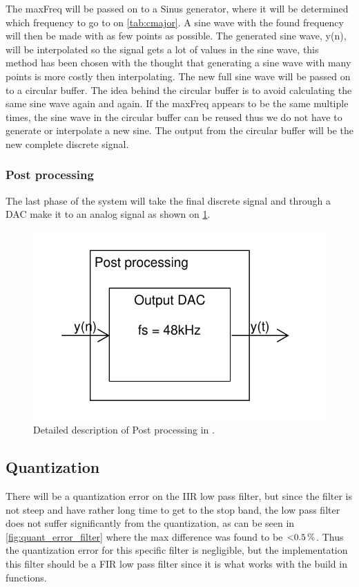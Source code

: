 The maxFreq will be passed on to a Sinus generator, where it will be determined which frequency to go to on \cref{tab:cmajor}.
A sine wave with the found frequency will then be made with as few points as possible.
The generated sine wave, y(n), will be interpolated so the signal gets a lot of values in the sine wave, this method has been chosen with the thought that generating a sine wave with many points is more costly then interpolating.
The new full sine wave will be passed on to a circular buffer.
The idea behind the circular buffer is to avoid calculating the same sine wave again and again.
If the maxFreq appears to be the same multiple times, the sine wave in the circular buffer can be reused thus we do not have to generate or interpolate a new sine.
The output from the circular buffer will be the new complete discrete signal.

\subsubsection{Post processing}
The last phase of the system will take the final discrete signal and through a DAC make it to an analog signal as shown on \cref{fig:DetailedPostPro}.
\begin{figure}
	\centering
	\includegraphics[width=1\linewidth]{gfx/Design/DesignPostPro_IF.pdf}
	\caption{Detailed description of Post processing in \systemName.}
	\label{fig:DetailedPostPro}
\end{figure}

\subsection{Quantization} 
There will be a quantization error on the IIR low pass filter, but since the filter is not steep and have rather long time to get to the stop band, the low pass filter does not suffer significantly from the quantization, as can be seen in \cref{fig:quant_error_filter} where the max difference was found to be $\SI{<0.5}{\percent} $.
Thus the quantization error for this specific filter is negligible, but the implementation this filter should be a FIR low pass filter since it is what works with the build in functions.


